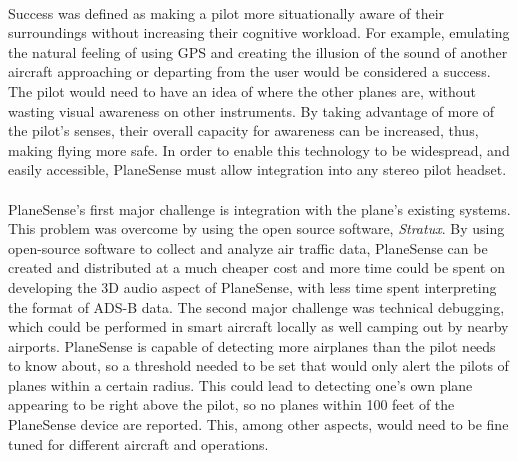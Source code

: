 \paragraph{}
Success was defined as making a pilot more situationally aware of their surroundings without increasing their cognitive workload.  For example, emulating the natural feeling of using GPS and creating the illusion of the sound of another aircraft approaching or departing from the user would be considered a success.  The pilot would need to have an idea of where the other planes are, without wasting visual awareness on other instruments. By taking advantage of more of the pilot's senses, their overall capacity for awareness can be increased, thus, making flying more safe. In order to enable this technology to be widespread, and easily accessible, PlaneSense must allow integration into any stereo pilot headset. 


\paragraph{} 
PlaneSense's first major challenge is integration with the plane’s existing systems. This problem was overcome by using the open source software, \textit{Stratux}.  By using open-source software to collect and analyze air traffic data, PlaneSense can be created and distributed at a much cheaper cost and more time could be spent on developing the 3D audio aspect of PlaneSense, with less time spent interpreting the format of ADS-B data. The second major challenge was technical debugging, which could be performed in smart aircraft locally as well camping out by nearby airports.  PlaneSense is capable of detecting more airplanes than the pilot needs to know about, so a threshold needed to be set that would only alert the pilots of planes within a certain radius.  This could lead to detecting one's own plane appearing to be right above the pilot, so no planes within 100 feet of the PlaneSense device are reported.  This, among other aspects, would need to be fine tuned for different aircraft and operations. 




